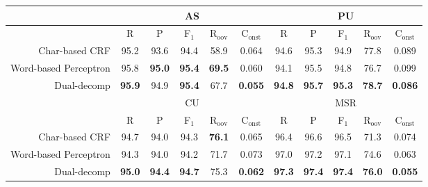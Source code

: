\begin{table*}
\centering
\begin{small}
\begin{tabular}{ r | c | c | c | c | c | c | c | c | c | c  }
\multicolumn{1}{c|}{} & \multicolumn{5}{c|}{AS} &  \multicolumn{5}{c}{PU} \\
\hline
\multicolumn{1}{c}{}   & \multicolumn{1}{|c}{R} &  \multicolumn{1}{c}{P}     &  \multicolumn{1}{c}{F$_1$}   &    \multicolumn{1}{c}{R$_{\mathrm{oov}}$}   &   \multicolumn{1}{c}{C$_{\mathrm{onst}}$}  & \multicolumn{1}{|c}{R}  &  \multicolumn{1}{c}{P}   &  \multicolumn{1}{c}{F$_1$}   &   \multicolumn{1}{c}{R$_{\mathrm{oov}}$}  &   \multicolumn{1}{c}{C$_{\mathrm{onst}}$} \\ 
Char-based CRF    &  95.2 &   93.6  & 94.4  &  58.9 & 0.064                                               &  94.6             &    95.3 & 94.9  &   77.8   & 0.089    \\
Word-based Perceptron &  95.8 & \textbf{95.0} & \textbf{95.4}  & \textbf{69.5} & 0.060  &  94.1             & 95.5  & 94.8  &  76.7 & 0.099     \\ 
Dual-decomp      & \textbf{95.9} & 94.9   & \textbf{95.4}  & {67.7} & \textbf{0.055}            & \textbf{94.8} & \textbf{95.7} & \textbf{95.3}  &  \textbf{78.7} & \textbf{0.086}   \\
\multicolumn{1}{c|}{} &  \multicolumn{5}{c|}{CU} &  \multicolumn{5}{c}{MSR}  \\
\hline
\multicolumn{1}{c}{}   & \multicolumn{1}{|c}{R} &  \multicolumn{1}{c}{P}     &  \multicolumn{1}{c}{F$_1$}   &    \multicolumn{1}{c}{R$_{\mathrm{oov}}$}   &   \multicolumn{1}{c}{C$_{\mathrm{onst}}$}  & \multicolumn{1}{|c}{R}  &  \multicolumn{1}{c}{P}   &  \multicolumn{1}{c}{F$_1$}   &   \multicolumn{1}{c}{R$_{\mathrm{oov}}$}  &   \multicolumn{1}{c}{C$_{\mathrm{onst}}$} \\ 
Char-based CRF                 & 94.7 & 94.0 & 94.3  & \textbf{76.1}                            & 0.065             & 96.4 &              96.6 &             96.5  & 71.3 & 0.074 \\
Word-based Perceptron    & 94.3 & 94.0 & 94.2  & 71.7                                         & 0.073              &  97.0 &              97.2                & 97.1  & 74.6 & 0.063  \\
Dual-decomp                   & \textbf{95.0} & \textbf{94.4}  & \textbf{94.7}  & {75.3} & \textbf{0.062} & \textbf{97.3} &  \textbf{97.4} &  \textbf{97.4}  & \textbf{76.0} & \textbf{0.055}  \\

\end{tabular}
\end{small}
\end{table*}
